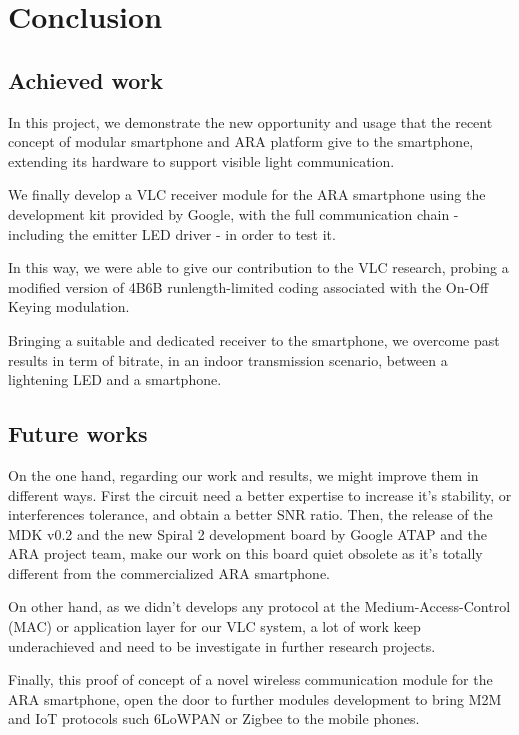 
\chapter{Conclusion}

\label{Conclusion}



\section{Achieved work}

In this project, we demonstrate the new opportunity and usage that the recent concept of modular smartphone and ARA platform give to the smartphone, extending its hardware to support visible light communication.

We finally develop a VLC receiver module for the ARA smartphone using the development kit provided by Google, with the full communication chain - including the emitter LED driver - in order to test it.

In this way, we were able to give our contribution to the VLC research, probing a modified version of 4B6B runlength-limited coding associated with the On-Off Keying modulation.

Bringing a suitable and dedicated receiver to the smartphone, we overcome past results in term of bitrate, in an indoor transmission scenario, between a lightening LED and a smartphone.



\section{Future works}

On the one hand, regarding our work and results, we might improve them in different ways. First the circuit need a better expertise to increase it's stability, or interferences tolerance, and obtain a better SNR ratio.
Then, the release of the MDK v0.2 and the new Spiral 2 development board by Google ATAP and the ARA project team, make our work on this board quiet obsolete as it's totally different from the commercialized ARA smartphone.

On other hand, as we didn't develops any protocol at the Medium-Access-Control (MAC) or application layer for our VLC system, a lot of work keep underachieved and need to be investigate in further research projects.

Finally, this proof of concept of a novel wireless communication module for the ARA smartphone, open the door to further modules development to bring  M2M and IoT protocols such 6LoWPAN or Zigbee to the mobile phones.
